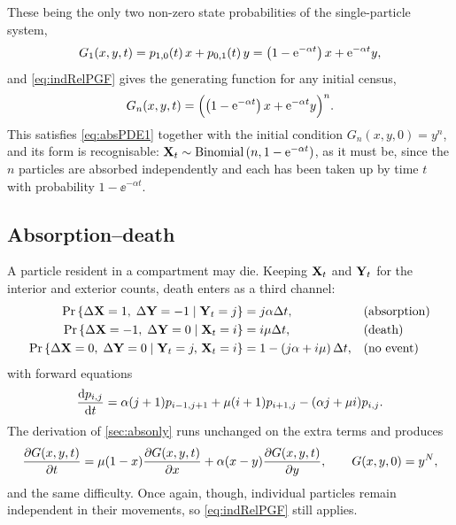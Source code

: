 These being the only two non-zero state probabilities of the single-particle system,
\begin{equation*}
G_1(x,y,t) = p_{1,0}(t)\,x + p_{0,1}(t)\,y = \left(1-{\rm e}^{-\alpha t}\right) x + {\rm e}^{-\alpha t}y ,
\end{equation*}
and \cref{eq:indRelPGF} gives the generating function for any initial census,
\begin{equation}
\label{eq:Gabsonly}
G_n(x,y,t) = \Bigl(\left(1-{\rm e}^{-\alpha t}\right) x + {\rm e}^{-\alpha t}y\Bigr)^{n} .
\end{equation}
This satisfies \cref{eq:absPDE1} together with the initial condition $G_n(x,y,0)=y^n$, and
its form is recognisable: ${{\bf X}_t}\sim\text{Binomial}\left( n,1-{\rm e}^{-\alpha t}\right)$, as it must be,
since the $n$ particles are absorbed independently and each has been taken up by time $t$
with probability $1-\ee^{-\alpha t}$.

\subsection{Absorption--death}
\label{sec:absdeath}

A particle resident in a compartment may die. Keeping ${{\bf X}_t}$ and ${{\bf Y}_t}$ for the interior and
exterior counts, death enters as a third channel:
\begin{align*}
{\text{Pr}\left\{\Delta{\bf X}=1,\;\Delta{\bf Y}=-1 \;|\; {{\bf Y}_t}=j\right\}} &= j\alpha\Delta t, &&\text{(absorption)}\\
{\text{Pr}\left\{\Delta{\bf X}=-1,\;\Delta{\bf Y}=0 \;|\; {{\bf X}_t}=i\right\}} &= i\mu\Delta t, &&\text{(death)}\\
{\text{Pr}\left\{\Delta{\bf X}=0,\;\Delta{\bf Y}=0 \;|\; {{\bf Y}_t}=j,\,{{\bf X}_t}=i\right\}} &= 1-\left( j\alpha+i\mu\right)\Delta t, &&\text{(no event)}
\end{align*}
with forward equations
\begin{equation}
\label{eq:FK2}
\displaystyle\frac{{\rm d} p_{i,j}}{{\rm d} t} = \alpha(j+1)p_{i-1,j+1} + \mu(i+1)p_{i+1,j} - (\alpha j+\mu i)p_{i,j} .
\end{equation}
The derivation of \cref{sec:absonly} runs unchanged on the extra terms and produces
\begin{equation}
\label{eq:PDE2}
\displaystyle\frac{\partial G(x,y,t)}{\partial t} = \mu(1-x)\displaystyle\frac{\partial G(x,y,t)}{\partial x} + \alpha(x-y)\displaystyle\frac{\partial G(x,y,t)}{\partial y},
\qquad G(x,y,0) = y^N ,
\end{equation}
and the same difficulty. Once again, though, individual particles remain independent in
their movements, so \cref{eq:indRelPGF} still applies.


